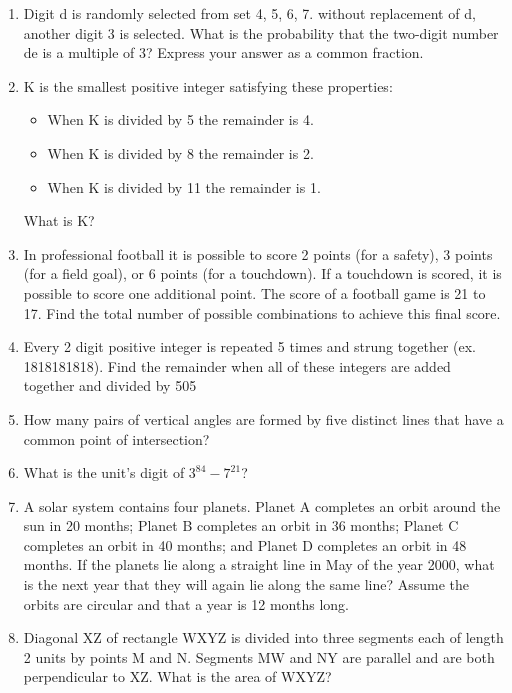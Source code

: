 \documentclass[12pt]{article}
\begin{document}
\begin{enumerate}
\bigskip
\item  Digit d is randomly selected from set {4, 5, 6, 7}. without
replacement of d, another digit 3 is selected. What is the
probability that the two-digit number de is a multiple of 3?
Express your answer as a common fraction.
\bigskip
\item K is the smallest positive integer satisfying these properties:
\begin{itemize}
\item When K is divided by 5 the remainder is 4.
\item When K is divided by 8 the remainder is 2.
\item When K is divided by 11 the remainder is 1.
\end{itemize}
What is K?
\item In professional football it is possible to score 2 points
(for a safety), 3 points (for a field goal), or 6 points (for a touchdown).
If a touchdown is scored, it is possible to score one additional point. The score of a football
game is 21 to 17. Find the total number of possible combinations to achieve this final score.
\item   Every 2 digit positive integer is repeated 5 times and strung together (ex. 1818181818).
Find the remainder when all of these integers are added together and divided by 505
\item How many pairs of vertical angles are formed by five distinct lines that have a
common point of intersection?
\item What is the unit’s digit of $3^{84} - 7^{21}$?
\item A solar system contains four planets.  
Planet A completes an orbit around the sun in 20 months;
Planet B completes an orbit in 36 months; Planet C completes an orbit in 40 months;
and Planet D completes an orbit in 48 months.  If the planets lie along a straight line
in May of the year 2000, what is the next year that they will again lie along the same line?
Assume the orbits are circular and that a year is 12 months long.
\item Diagonal XZ of rectangle WXYZ is divided into three segments each of length
2 units by points M and N. Segments MW and NY are parallel and are
both perpendicular to XZ. What is the area of WXYZ?

\end{enumerate}
\end{document}
